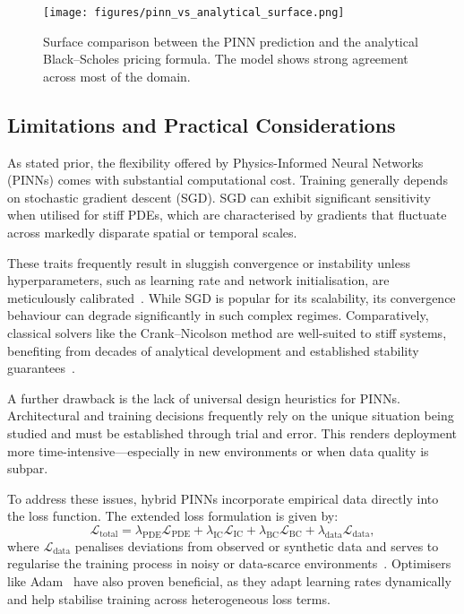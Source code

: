 \documentclass[12pt,a4paper]{article}
\begin{document}
\begin{figure}[h!]
  \centering
  \texttt{[image: figures/pinn\_vs\_analytical\_surface.png]}
  \caption{Surface comparison between the PINN prediction and the analytical Black--Scholes pricing formula. The model shows strong agreement across most of the domain.}
  \label{fig:pinn-vs-analytical}
\end{figure}


\subsection{Limitations and Practical Considerations}

As stated prior, the flexibility offered by Physics-Informed Neural Networks (PINNs) comes with substantial computational cost. Training generally depends on stochastic gradient descent (SGD). SGD can exhibit significant sensitivity when utilised for stiff PDEs, which are characterised by gradients that fluctuate across markedly disparate spatial or temporal scales.

These traits frequently result in sluggish convergence or instability unless hyperparameters, such as learning rate and network initialisation, are meticulously calibrated~\cite{mishra2022estimates}. While SGD is popular for its scalability, its convergence behaviour can degrade significantly in such complex regimes. Comparatively, classical solvers like the Crank--Nicolson method are well-suited to stiff systems, benefiting from decades of analytical development and established stability guarantees~\cite{leveque2007finite}.

A further drawback is the lack of universal design heuristics for PINNs. Architectural and training decisions frequently rely on the unique situation being studied and must be established through trial and error. This renders deployment more time-intensive—especially in new environments or when data quality is subpar.

To address these issues, hybrid PINNs incorporate empirical data directly into the loss function. The extended loss formulation is given by:
\begin{equation}
\mathcal{L}_{\text{total}} = \lambda_{\text{PDE}} \mathcal{L}_{\text{PDE}} + \lambda_{\text{IC}} \mathcal{L}_{\text{IC}} + \lambda_{\text{BC}} \mathcal{L}_{\text{BC}} + \lambda_{\text{data}} \mathcal{L}_{\text{data}},
\label{eq:hybrid-loss}
\end{equation}
where \(\mathcal{L}_{\text{data}}\) penalises deviations from observed or synthetic data and serves to regularise the training process in noisy or data-scarce environments~\cite{finlay2022train}. Optimisers like Adam~\cite{kingma2014adam} have also proven beneficial, as they adapt learning rates dynamically and help stabilise training across heterogeneous loss terms.
\end{document}
